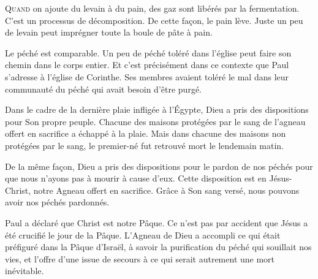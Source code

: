 \dvrule







\lettrine{Q}{uand} on ajoute du levain à du pain,
 des gaz sont libérés par la fermentation.
 C'est un processus de décomposition.
 De cette fa\c{c}on, le pain lève.
 Juste un peu de levain peut imprégner
 toute la boule de pâte à pain.

Le péché est comparable.
 Un peu de péché toléré dans l'église
 peut faire son chemin dans le corps entier.
 Et c'est précisément dans ce contexte que Paul
 s'adresse à l'église de Corinthe.
 Ses membres avaient toléré le mal
 dans leur communauté
 \ocadr du péché qui avait besoin d'être purgé.


Dans le cadre de la dernière plaie infligée à l'Égypte,
 Dieu a pris des dispositions pour Son propre peuple.
 Chacune des maisons protégées par le sang de l'agneau
 offert en sacrifice a échappé à la plaie.
 Mais dans chacune des maisons non protégées par le sang,
 le premier-né fut retrouvé mort le lendemain matin.

De la même fa\c{c}on, Dieu a pris des dispositions
 pour le pardon de nos péchés pour que nous n'ayons pas
 à mourir à cause d'eux.
 Cette disposition est en Jésus-Christ,
 notre Agneau offert en sacrifice.
 Grâce à Son sang versé,
 nous pouvons avoir nos péchés pardonnés.

Paul a déclaré que \Og Christ est notre Pâque. \Fg{}
 Ce n'est pas par accident que Jésus a été crucifié le jour de la Pâque.
 L'Agneau de Dieu a accompli ce qui était préfiguré
 dans la Pâque d'Israël, à savoir la purification du péché
 qui souillait nos vies, et l'offre d'une issue de secours
 à ce qui serait autrement une mort inévitable.

\dvrule




